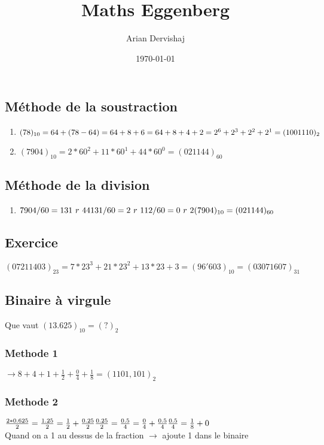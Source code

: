 \documentclass[a4paper, 12pt]{article}
\title{Maths Eggenberg}
\author{Arian Dervishaj}
\date{\today}
\begin{document}
\maketitle
\pagebreak

\subsection*{Méthode de la soustraction}

\begin{enumerate}
    \item   $(78)_{10}= 64 + (78-64) = 64 + 8 + 6 = 64 + 8 + 4 + 2 = \\
            2^{6} + 2^{3} + 2^{2} + 2^{1} = (1001110)_2$
    \item   $(7904)_{10} = 2 * 60^{2} + 11 * 60^{1} + 44 * 60^{0} = (021144)_{60}$
\end{enumerate}

\subsection*{Méthode de la division}

\begin{enumerate}
    \item   $7904 / 60 = 131\  r\ 44 \\
            131 / 60 = 2\ r\ 11 \\ 
            2 / 60 = 0\ r\ 2 \\ 
            (7904)_{10} = (021144)_{60}$
\end{enumerate}

\subsection*{Exercice}
    $(07211403)_{23} = 7 * 23^{3} + 21 * 23^{2} + 13*23 + 3 = (96'603)_{10} = (03071607)_{31}$



\pagebreak
\subsection*{Binaire à virgule}
Que vaut $(13.625)_{10} = (?)_{2}$
\subsubsection*{Methode 1}
$ \rightarrow 8 + 4 + 1 + \frac{1}{2} + \frac{0}{4} + \frac{1}{8} = (1101,101)_2$

\subsubsection*{Methode 2}

$\frac{2*0.625}{2} = \frac{1.25}{2} = \frac{1}{2} + \frac{0.25}{2} \\
\frac{0.25}{2} = \frac{0.5}{4} = \frac{0}{4} + \frac{0.5}{4} \\
\frac{0.5}{4} = \frac{1}{8} + 0$ \\

Quand on a 1 au dessus de la fraction $\rightarrow$ ajoute 1 dans le binaire
\end{document}

